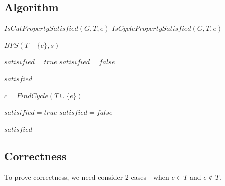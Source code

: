 \documentclass{article}
\begin{document}
    \subsection*{Algorithm}
        \begin{algorithm}[H]
            \begin{algorithmic}
                        \State \Return $IsCutPropertySatisfied(G, T, e)$
                    \Else
                        \State \Return $IsCyclePropertySatisfied(G, T, e)$
                    \EndIf
                \EndProcedure

                            \State $BFS(T-\{e\}, s)$
                        \EndIf
                    \EndFor

                    \State $satisified = true$
                                \State $satisified = false$
                            \EndIf
                        \EndIf
                    \EndFor

                    \State \Return $satisfied$
                \EndProcedure

                    \State $c = FindCycle(T \cup \{e\})$

                    \State $satisified = true$
                            \State $satisfied = false$
                        \EndIf
                    \EndFor

                    \State \Return $satisfied$
                \EndProcedure
            \end{algorithmic}
        \end{algorithm}

    \subsection*{Correctness}
    To prove correctness, we need consider 2 cases - when $e \in T$ and $e \notin T$.
\end{document}
